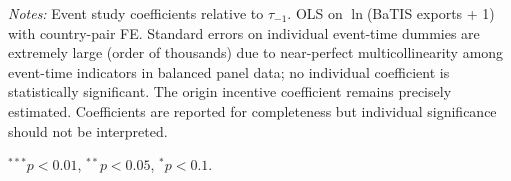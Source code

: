\begin{table}[htbp]
\par\vspace{4pt}\noindent\begin{minipage}{\textwidth}
\footnotesize
\par \textit{Notes:} Event study coefficients relative to $\tau_{-1}$. OLS on $\ln$(BaTIS exports + 1) with country-pair FE. Standard errors on individual event-time dummies are extremely large (order of thousands) due to near-perfect multicollinearity among event-time indicators in balanced panel data; no individual coefficient is statistically significant. The origin incentive coefficient remains precisely estimated. Coefficients are reported for completeness but individual significance should not be interpreted.
\par $^{***}p<0.01$, $^{**}p<0.05$, $^{*}p<0.1$.
\end{minipage}
\end{table}

\clearpage


